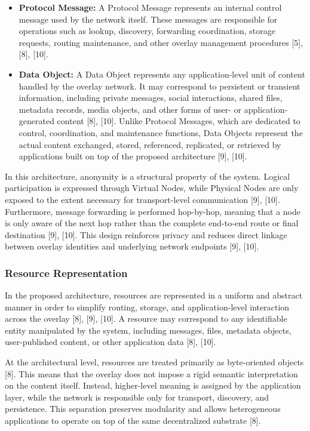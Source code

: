 \documentclass[12pt,a4paper]{article}
\begin{document}
\begin{itemize}
\item \textbf{Protocol Message:}  
A Protocol Message represents an internal control message used by the network itself. These messages are responsible for operations such as lookup, discovery, forwarding coordination, storage requests, routing maintenance, and other overlay management procedures [5], [8], [10].

\item \textbf{Data Object:}  
A Data Object represents any application-level unit of content handled
by the overlay network. It may correspond to persistent or transient information,
including private messages, social interactions, shared files, metadata records,
media objects, and other forms of user- or application-generated content [8], [10].
Unlike Protocol Messages, which are dedicated to control, coordination, and
maintenance functions, Data Objects represent the actual content exchanged,
stored, referenced, replicated, or retrieved by applications built on top of the
proposed architecture [9], [10].

\end{itemize}

In this architecture, anonymity is a structural property of the system. Logical participation is expressed through Virtual Nodes, while Physical Nodes are only exposed to the extent necessary for transport-level communication [9], [10]. Furthermore, message forwarding is performed hop-by-hop, meaning that a node is only aware of the next hop rather than the complete end-to-end route or final destination [9], [10]. This design reinforces privacy and reduces direct linkage between overlay identities and underlying network endpoints [9], [10].


\subsubsection{Resource Representation}

In the proposed architecture, resources are represented in a uniform and abstract
manner in order to simplify routing, storage, and application-level interaction across
the overlay [8], [9], [10]. A resource may correspond to any identifiable entity manipulated by the
system, including messages, files, metadata objects, user-published content, or other
application data [8], [10].

At the architectural level, resources are treated primarily as byte-oriented objects [8].
This means that the overlay does not impose a rigid semantic interpretation on the
content itself. Instead, higher-level meaning is assigned by the application layer,
while the network is responsible only for transport, discovery, and persistence. This
separation preserves modularity and allows heterogeneous applications to operate on
top of the same decentralized substrate [8].
\end{document}
